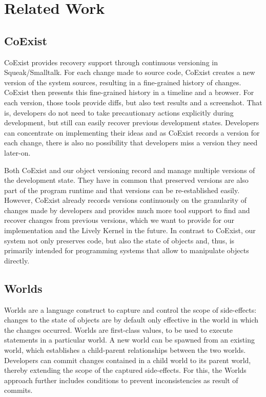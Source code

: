\chapter{Related Work} \label{sec:RELATED_WORK}





\section{CoExist}

\cite{Steinert2012COE}
CoExist provides recovery support through continuous versioning in Squeak/Smalltalk.
For each change made to source code, CoExist creates a new version of the system sources, resulting in a fine-grained history of changes.
CoExist then presents this fine-grained history in a timeline and a browser.
For each version, those tools provide diffs, but also test results and a screenshot.
That is, developers do not need to take precautionary actions explicitly during development, but still can easily recover previous development states.
Developers can concentrate on implementing their ideas and as CoExist records a version for each change, there is also no possibility that developers miss a version they need later-on.

Both CoExist and our object versioning record and manage multiple versions of the development state.
They have in common that preserved versions are also part of the program runtime and that versions can be re-established easily.
However, CoExist already records versions continuously on the granularity of changes made by developers and provides much more tool support to find and recover changes from previous versions, which we want to provide for our implementation and the Lively Kernel in the future.
In contrast to CoExist, our system not only preserves code, but also the state of objects and, thus, is primarily intended for programming systems that allow to manipulate objects directly.


\section{Worlds}

Worlds are a language construct to capture and control the scope of side-effects: changes to the state of objects are by default only effective in the world in which the changes occurred.
Worlds are first-class values, to be used to execute statements in a particular world.
A new world can be spawned from an existing world, which establishes a child-parent relationships between the two worlds.
Developers can commit changes contained in a child world to its parent world, thereby extending the scope of the captured side-effects.
For this, the Worlds approach further includes conditions to prevent inconsistencies as result of commits.

